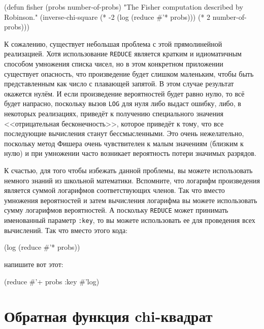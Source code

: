 \begin{myverb}
(defun fisher (probs number-of-probs)
  "The Fisher computation described by Robinson."
  (inverse-chi-square 
   (* -2 (log (reduce #'* probs)))
   (* 2 number-of-probs)))
\end{myverb}

К сожалению, существует небольшая проблема с этой прямолинейной реализацией.  Хотя
использование \lstinline{REDUCE} является кратким и идиоматичным способом умножения списка
чисел, но в этом конкретном приложении существует опасность, что произведение будет
слишком маленьким, чтобы быть представленным как число с плавающей запятой. В этом случае
результат окажется нулём.  И если произведение
вероятностей будет равно нулю, то всё будет напрасно, поскольку вызов \lstinline{LOG} для нуля
либо выдаст ошибку, либо, в некоторых реализациях, приведёт к получению специального
значения <<отрицательная бесконечность>>, которое приведёт к тому, что все последующие
вычисления станут бессмысленными.  Это очень нежелательно, поскольку метод Фишера очень
чувствителен к малым значениям (близким к нулю) и при умножении часто возникает
вероятность потери значимых разрядов.

К счастью, для того чтобы избежать данной проблемы, вы можете использовать немного знаний
из школьной математики.  Вспомните, что логарифм произведения является суммой логарифмов
соответствующих членов.  Так что вместо умножения вероятностей и затем вычисления
логарифма вы можете использовать сумму логарифмов вероятностей.  А поскольку
\lstinline{REDUCE} может принимать именованный параметр \lstinline{:key}, то вы можете использовать
ее для проведения всех вычислений.  Так что вместо этого кода:

\begin{myverb}
(log (reduce #'* probs))
\end{myverb}

\noindent{}напишите вот этот:

\begin{myverb}
(reduce #'+ probs :key #'log)
\end{myverb}

\section{Обратная функция chi-квадрат}


